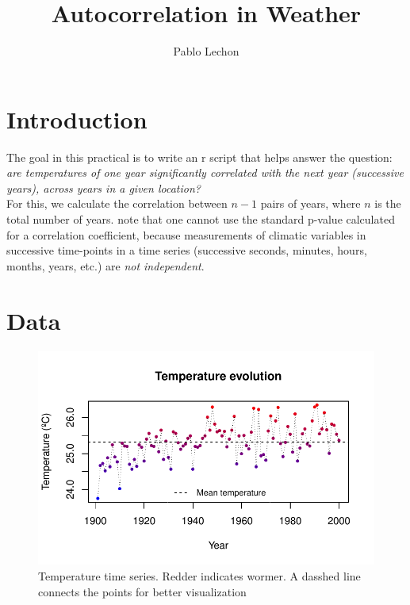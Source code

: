 \documentclass[12pt]{article}
\title{Autocorrelation in Weather}
\author{Pablo Lechon}
\date{}
\begin{document}
	\maketitle	
	\section{Introduction}
		The goal in this practical is to write an r script that helps answer the question: \textit{are temperatures of one year significantly correlated with the next year (successive years), across years in a given location?}\\
		For this, we calculate the correlation between $n - 1$ pairs of years, where $n$ is the total number of years. note that one cannot use the standard p-value calculated for a correlation coefficient, because measurements of climatic variables in successive time-points in a time series (successive seconds, minutes, hours, months, years, etc.) are \textit{not independent}.

	\section{Data}
		\begin{figure}[h]
			\includegraphics{temp_evolution.pdf}		
			\centering
			\caption{Temperature time series. Redder indicates wormer. A dasshed line connects the points for better visualization}
			\label{temp}
		\end{figure}
\end{document}
